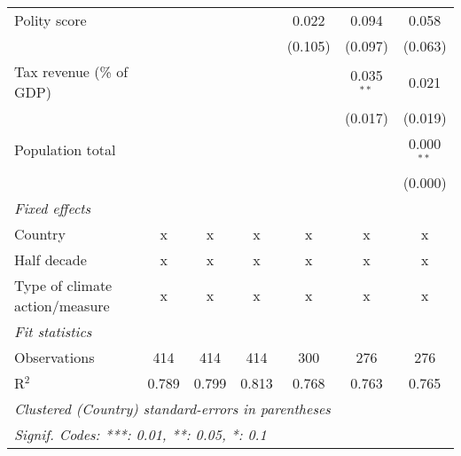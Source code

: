 \begin{tabular}{lcccccc}
   Polity score                                                   &              &                &                & 0.022          & 0.094          & 0.058\\   
                                                                  &              &                &                & (0.105)        & (0.097)        & (0.063)\\   
   Tax revenue (\% of GDP)                                        &              &                &                &                & 0.035$^{**}$   & 0.021\\   
                                                                  &              &                &                &                & (0.017)        & (0.019)\\   
   Population total                                               &              &                &                &                &                & 0.000$^{**}$\\   
                                                                  &              &                &                &                &                & (0.000)\\   
   \emph{Fixed effects}\\
   Country                                                        & x            & x              & x              & x              & x              & x\\  
   Half decade                                                    & x            & x              & x              & x              & x              & x\\  
   Type of climate action/measure                                 & x            & x              & x              & x              & x              & x\\  
   \midrule \emph{Fit statistics}\\
   Observations                                                   & 414          & 414            & 414            & 300            & 276            & 276\\  
   R$^2$                                                          & 0.789        & 0.799          & 0.813          & 0.768          & 0.763          & 0.765\\  
   \midrule
   \multicolumn{7}{l}{\emph{Clustered (Country) standard-errors in parentheses}}\\
   \multicolumn{7}{l}{\emph{Signif. Codes: ***: 0.01, **: 0.05, *: 0.1}}\\
\end{tabular}
\par\endgroup


